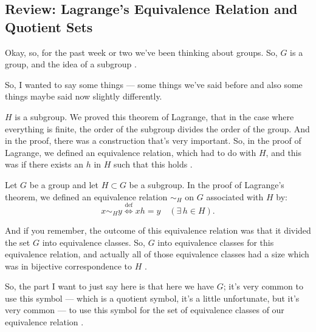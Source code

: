 \subsection{Review: Lagrange's Equivalence Relation and Quotient Sets}

\begin{speech}[00:00:02 - 00:01:04]
Okay, so, for the past week or two we've been thinking about groups. So, $G$ is a group, and the idea of a subgroup .

So, I wanted to say some things --- some things we've said before and also some things maybe said now slightly differently.

$H$ is a subgroup. We proved this theorem of Lagrange, that in the case where everything is finite, the order of the subgroup divides the order of the group. And in the proof, there was a construction that's very important. So, in the proof of Lagrange, we defined an equivalence relation, which had to do with $H$, and this was if there exists an $h$ in $H$ such that this holds .
\end{speech}

\begin{content}

Let $G$ be a group and let $H \subset G$ be a subgroup. In the proof of Lagrange's theorem, we defined an equivalence relation $\sim_H$ on $G$ associated with $H$ by:
\[
x \sim_H y \stackrel{\text{def}}{\iff} xh = y \quad (\exists\, h \in H).
\]
\end{content}

\begin{speech}[00:01:04 - 00:01:51]
And if you remember, the outcome of this equivalence relation was that it divided the set $G$ into equivalence classes. So, $G$ into equivalence classes for this equivalence relation, and actually all of those equivalence classes had a size which was in bijective correspondence to $H$ .

So, the part I want to just say here is that here we have $G$; it's very common to use this symbol --- which is a quotient symbol, it's a little unfortunate, but it's very common --- to use this symbol for the set of equivalence classes of our equivalence relation .
\end{speech}

